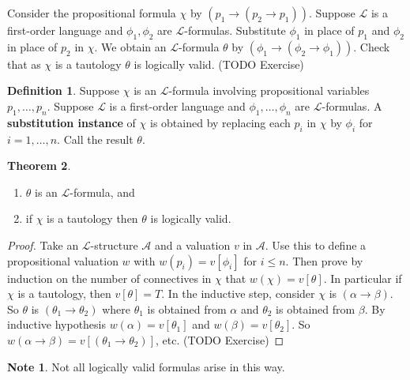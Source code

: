 \documentclass{article}
\newcommand{\A}{\mathcal{A}}
\renewcommand{\L}{\mathcal{L}}
\newcommand{\rb}[1]{\left( #1 \right)}
\renewcommand{\sb}[1]{\left[ #1 \right]}
\newcommand{\impb}[2]{\rb{#1 \rightarrow #2}}
\theoremstyle{definition}\newtheorem{definition}{Definition}[subsection]
\theoremstyle{definition}\newtheorem{remark}[definition]{Remark}
\theoremstyle{definition}\newtheorem*{example}{Example}
\theoremstyle{definition}\newtheorem*{note}{Note}
\newtheorem{theorem}[definition]{Theorem}
\begin{document}
Consider the propositional formula $ \chi $ by $ \impb{p_1}{\impb{p_2}{p_1}} $. Suppose $ \L $ is a first-order language and $ \phi_1, \phi_2 $ are $ \L $-formulas. Substitute $ \phi_1 $ in place of $ p_1 $ and $ \phi_2 $ in place of $ p_2 $ in $ \chi $. We obtain an $ \L $-formula $ \theta $ by $ \impb{\phi_1}{\impb{\phi_2}{\phi_1}} $. Check that as $ \chi $ is a tautology $ \theta $ is logically valid. (TODO Exercise)

\begin{definition}
Suppose $ \chi $ is an $ \L $-formula involving propositional variables $ p_1, \dots, p_n $. Suppose $ \L $ is a first-order language and $ \phi_1, \dots, \phi_n $ are $ \L $-formulas. A \textbf{substitution instance} of $ \chi $ is obtained by replacing each $ p_i $ in $ \chi $ by $ \phi_i $ for $ i = 1, \dots, n $. Call the result $ \theta $.
\end{definition}

\begin{theorem}
\hfill
\begin{enumerate}
\item $ \theta $ is an $ \L $-formula, and
\item if $ \chi $ is a tautology then $ \theta $ is logically valid.
\end{enumerate}
\end{theorem}


\begin{proof}
Take an $ \L $-structure $ \A $ and a valuation $ v $ in $ \A $. Use this to define a propositional valuation $ w $ with $ w\rb{p_i} = v\sb{\phi_i} $ for $ i \le n $. Then prove by induction on the number of connectives in $ \chi $ that $ w\rb{\chi} = v\sb{\theta} $. In particular if $ \chi $ is a tautology, then $ v\sb{\theta} = T $. In the inductive step, consider $ \chi $ is $ \impb{\alpha}{\beta} $. So $ \theta $ is $ \impb{\theta_1}{\theta_2} $ where $ \theta_1 $ is obtained from $ \alpha $ and $ \theta_2 $ is obtained from $ \beta $. By inductive hypothesis $ w\rb{\alpha} = v\sb{\theta_1} $ and $ w\rb{\beta} = v\sb{\theta_2} $. So $ w\impb{\alpha}{\beta} = v\sb{\impb{\theta_1}{\theta_2}} $, etc. (TODO Exercise)
\end{proof}

\begin{note}
Not all logically valid formulas arise in this way.
\end{note}
\end{document}
